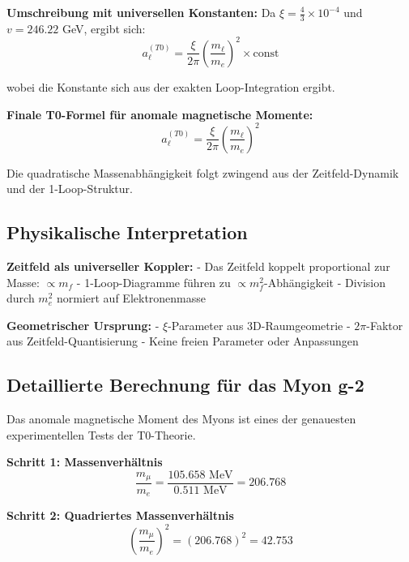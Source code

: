 \documentclass[12pt,a4paper]{article}
\theoremstyle{definition}
\begin{document}
	\textbf{Umschreibung mit universellen Konstanten:}
	Da $\xi = \frac{4}{3} \times 10^{-4}$ und $v = 246.22$ GeV, ergibt sich:
	\begin{equation}
		a_\ell^{(T0)} = \frac{\xi}{2\pi} \left(\frac{m_\ell}{m_e}\right)^2 \times \text{const}
	\end{equation}
	
	wobei die Konstante sich aus der exakten Loop-Integration ergibt.
	
	\begin{formel}
		\textbf{Finale T0-Formel für anomale magnetische Momente:}
		\begin{equation}
			\boxed{a_\ell^{(T0)} = \frac{\xi}{2\pi} \left(\frac{m_\ell}{m_e}\right)^2}
		\end{equation}
		
		Die quadratische Massenabhängigkeit folgt zwingend aus der Zeitfeld-Dynamik und der 1-Loop-Struktur.
	\end{formel}
	
	\subsection{Physikalische Interpretation}
	
	\textbf{Zeitfeld als universeller Koppler:}
	- Das Zeitfeld koppelt proportional zur Masse: $\propto m_f$
	- 1-Loop-Diagramme führen zu $\propto m_f^2$-Abhängigkeit
	- Division durch $m_e^2$ normiert auf Elektronenmasse
	
	\textbf{Geometrischer Ursprung:}
	- $\xi$-Parameter aus 3D-Raumgeometrie
	- $2\pi$-Faktor aus Zeitfeld-Quantisierung
	- Keine freien Parameter oder Anpassungen
	
	\subsection{Detaillierte Berechnung für das Myon g-2}
	
	Das anomale magnetische Moment des Myons ist eines der genauesten experimentellen Tests der T0-Theorie.
	
	\textbf{Schritt 1: Massenverhältnis}
	\begin{equation}
		\frac{m_\mu}{m_e} = \frac{105.658 \text{ MeV}}{0.511 \text{ MeV}} = 206.768
	\end{equation}
	
	\textbf{Schritt 2: Quadriertes Massenverhältnis}
	\begin{equation}
		\left(\frac{m_\mu}{m_e}\right)^2 = (206.768)^2 = 42.753
	\end{equation}
	
\end{document}
